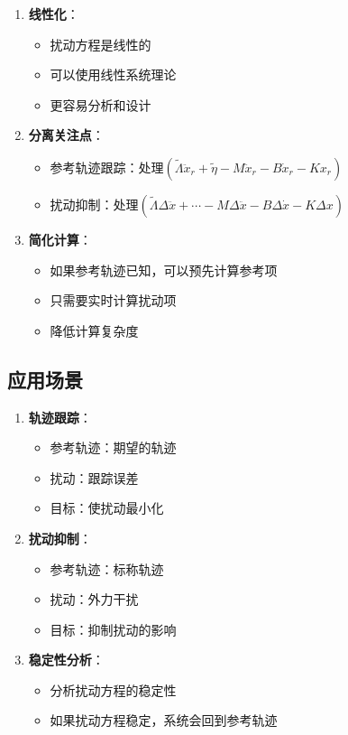\documentclass[12pt,a4paper]{article}
\begin{document}
\begin{enumerate}
\item \textbf{线性化}：
\begin{itemize}
\item 扰动方程是线性的
\item 可以使用线性系统理论
\item 更容易分析和设计
\end{itemize}

\item \textbf{分离关注点}：
\begin{itemize}
\item 参考轨迹跟踪：处理$(\tilde{\Lambda}\ddot{x}_r + \tilde{\eta} - M\ddot{x}_r - B\dot{x}_r - Kx_r)$
\item 扰动抑制：处理$(\tilde{\Lambda}\Delta \ddot{x} + \cdots - M\Delta \ddot{x} - B\Delta \dot{x} - K\Delta x)$
\end{itemize}

\item \textbf{简化计算}：
\begin{itemize}
\item 如果参考轨迹已知，可以预先计算参考项
\item 只需要实时计算扰动项
\item 降低计算复杂度
\end{itemize}
\end{enumerate}

\subsection{应用场景}

\begin{enumerate}
\item \textbf{轨迹跟踪}：
\begin{itemize}
\item 参考轨迹：期望的轨迹
\item 扰动：跟踪误差
\item 目标：使扰动最小化
\end{itemize}

\item \textbf{扰动抑制}：
\begin{itemize}
\item 参考轨迹：标称轨迹
\item 扰动：外力干扰
\item 目标：抑制扰动的影响
\end{itemize}

\item \textbf{稳定性分析}：
\begin{itemize}
\item 分析扰动方程的稳定性
\item 如果扰动方程稳定，系统会回到参考轨迹
\end{itemize}
\end{enumerate}
\end{document}
